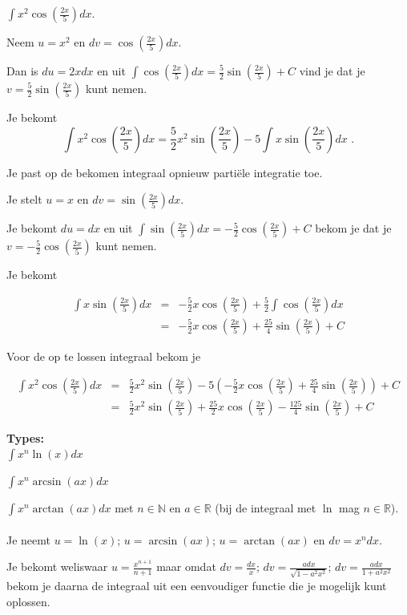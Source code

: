 \begin{voorbeeld}
	$\int x^2 \cos \left( \frac{2x}{5}  \right)dx$.
	
	Neem $u=x^2$ en $dv=\cos \left( \frac{2x}{5}  \right)dx$.
	
	Dan is $du=2xdx$ en uit $\int \cos \left( \frac{2x}{5}  \right)dx=\frac{5}{2} \sin \left(  \frac{2x}{5} \right)+C$ vind je dat je $v=\frac{5}{2} \sin \left(  \frac{2x}{5} \right)$ kunt nemen.
	
	Je bekomt
	\[
	\int x^2 \cos \left( \frac{2x}{5}  \right)dx=\frac{5}{2}x^2  \sin \left(  \frac{2x}{5} \right)-5\int x  \sin \left(  \frac{2x}{5} \right)dx \text { .}
	\]
	
	Je past op de bekomen integraal opnieuw parti\"ele integratie toe.
	
	Je stelt $u=x$ en $dv= \sin \left(  \frac{2x}{5} \right)dx$.
	
	Je bekomt $du=dx$ en uit $\int  \sin \left(  \frac{2x}{5} \right)dx=-\frac{5}{2}\cos \left(  \frac{2x}{5} \right)+C$ bekom je dat je $v=-\frac{5}{2}\cos \left(  \frac{2x}{5} \right)$ kunt nemen.
	
	Je bekomt
	
	\begin{eqnarray}
		\int x  \sin \left(  \frac{2x}{5} \right)dx&=&-\frac{5}{2} x \cos \left(  \frac{2x}{5} \right)+\frac{5}{2}\int \cos \left( \frac{2x}{5}  \right)dx \\
		&=&-\frac{5}{2} x \cos \left(  \frac{2x}{5} \right)+\frac{25}{4}\sin \left( \frac{2x}{5} \right)+C
	\end{eqnarray}
	
	Voor de op te lossen integraal bekom je
	
	\begin{eqnarray*}
		\int x^2 \cos \left( \frac{2x}{5}  \right)dx &=&\frac{5}{2}x^2  \sin \left(  \frac{2x}{5} \right)-5\left( -\frac{5}{2} x \cos \left(  \frac{2x}{5} \right)+\frac{25}{4}\sin \left( \frac{2x}{5} \right)   \right)+C \\
		&=& \frac{5}{2}x^2  \sin \left(  \frac{2x}{5} \right)+\frac{25}{2} x \cos \left(  \frac{2x}{5} \right)-\frac{125}{4}\sin \left( \frac{2x}{5} \right)  +C
	\end{eqnarray*}
\end{voorbeeld}

\begin{ftrekenregel}
	
	\textbf{Types:}\\
	
	$\int x^n \ln (x)dx$
	
	$\int x^n \arcsin(ax)dx$
	
	$\int x^n \arctan(ax)dx$ met $n \in \mathbb{N}$ en $a \in \mathbb{R}$ (bij de integraal met $\ln$ mag $n \in \mathbb{R}$).
	\\
	\\
	Je neemt $u= \ln (x)$; $u=\arcsin (ax)$; $u=\arctan (ax)$ en $dv=x^n dx$.
	
	Je bekomt weliswaar $u=\frac {x^{n+1}}{n+1}$ maar omdat $dv=\frac{dx}{x}$; $dv=\frac{adx}{\sqrt{1-a^2x^2}}$; $dv=\frac {adx}{1+a^2x^2}$ bekom je daarna de integraal uit een eenvoudiger functie die je mogelijk kunt oplossen.

\end{ftrekenregel}

